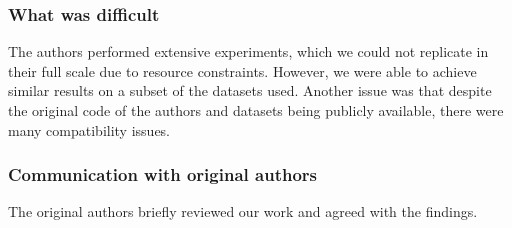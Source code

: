 \subsubsection*{What was difficult}
The authors performed extensive experiments, which we could not replicate in their full scale due to resource constraints. However, we were able to achieve similar results on a subset of the datasets used.
Another issue was that despite the original code of the authors and datasets being publicly available, there were many compatibility issues.

\subsubsection*{Communication with original authors}
The original authors briefly reviewed our work and agreed with the findings.
